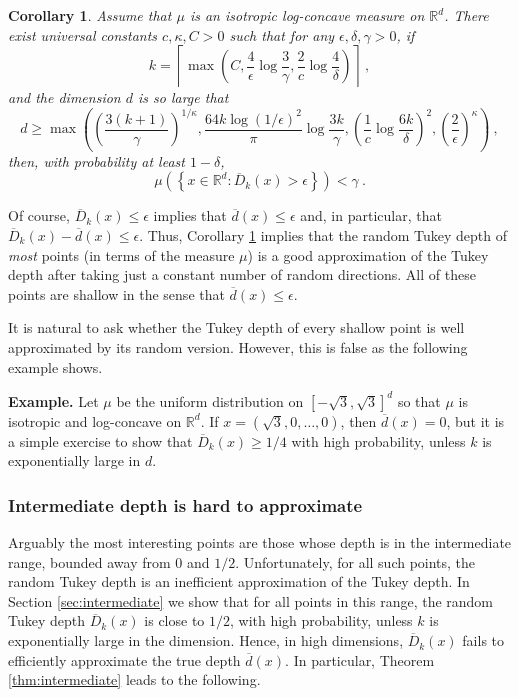 \documentclass[12pt]{article}
\newcommand{\R}{\mathbb{R}}
\newcommand{\ol}{\overline}
\newtheorem{corollary}[theorem]{Corollary}
\begin{document}
\begin{tcolorbox}
\begin{corollary}
\label{cor:shallow}
Assume that $\mu$ is an isotropic log-concave measure on $\R^d$.
There exist universal constants $c,\kappa,C>0$ such that for any $\epsilon,\delta,\gamma >0$, if
 \[
   k = \left\lceil
     \max\left(C,\frac{4}{\epsilon}\log\frac{3}{\gamma},\frac{2}{c}\log\frac{4}{\delta} \right)  \right\rceil~, 
   \]
   and the dimension $d$ is so large that
   \[
     d \ge \max\left(\left(\frac{3(k+1)}{\gamma}\right)^{1/\kappa}, \frac{64 k \log(1/\epsilon)^2}{\pi}\log\frac{3k}{\gamma},
       \left(\frac{1}{c}\log\frac{6k}{\delta}\right)^2, \left(\frac{2}{\epsilon}\right)^{\kappa} \right)~,
   \]
   then, with probability at least $1-\delta$,
\[
    \mu\left(\left\{x\in \R^d: \ol{D}_k(x) > \epsilon\right\} \right) < \gamma~.
\]
\end{corollary}
\end{tcolorbox}

Of course, $\ol{D}_k(x) \le \epsilon$ implies that $\ol{d}(x) \le \epsilon$ and, in particular,
that $\ol{D}_k(x) -\ol{d}(x) \le \epsilon$. Thus, Corollary \ref{cor:shallow} implies that the random Tukey depth 
of \emph{most} points (in terms of the measure $\mu$) is a good approximation of the Tukey depth
after taking just a constant number of random directions. All of these points are shallow in the sense
that $\ol{d}(x) \le \epsilon$. 

It is natural to ask whether the Tukey depth of every shallow point is well approximated by 
its random version. However, this is false as the following example shows.

\medskip
\noindent
{\bf Example.}
Let $\mu$ be the uniform distribution on $[-\sqrt{3},\sqrt{3}]^d$ so that $\mu$ is
isotropic and log-concave on $\R^d$. If $x=(\sqrt{3},0,\ldots,0)$, then $\ol{d}(x)=0$, but
it is a simple exercise to show that $\ol{D}_k(x) \ge 1/4$ with high probability, unless $k$
is exponentially large in $d$.


\subsubsection*{Intermediate depth is hard to approximate}

Arguably the most interesting points are those whose depth is in the intermediate range,
bounded away from $0$ and $1/2$. Unfortunately, for all such points, the random Tukey depth
is an inefficient approximation of the Tukey depth.
In Section \ref{sec:intermediate} we show that
for all points in this range, the random Tukey depth $\ol{D}_k(x)$ is close to $1/2$, with high probability,
unless $k$ is exponentially large in the dimension. Hence, in high dimensions,
$\ol{D}_k(x)$ fails to efficiently approximate the true depth $\ol{d}(x)$.
In particular, Theorem \ref{thm:intermediate} leads to the following.
\end{document}
